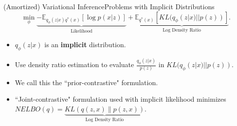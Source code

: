 \documentclass[handout]{beamer}
\newcommand{\E}{\mathbb{E}}
\begin{document}
\begin{frame}{(Amortized) Variational Inference}{Problems with Implicit Distributions}
\[\min_\phi \underbrace{-\mathbb{E}_{q_\phi(z|x)q^*(x)}[\log p(x|z)]}_\text{Likelihood}+\underbrace{\mathbb{E}_{q^*(x)}[KL(q_\phi(z|x)||p(z))]}_\text{Log Density Ratio}.\]
\begin{itemize}
\item $q_\phi(z|x)$ is an \textbf{implicit} distribution.
\vspace{0.2cm}
\item Use density ratio estimation to evaluate $\frac{q_\phi(z|x)}{p(z)}$ in $KL(q_\phi(z|x)||p(z))$.
\vspace{0.2cm}
\item We call this the ``prior-contrastive" formulation.
\vspace{0.2cm}
\item ``Joint-contrastive" formulation used with implicit likelihood minimizes $NELBO(q)=\underbrace{KL(q(z,x)\|p(z,x))}_\text{Log Density Ratio}$.
\end{itemize}
\end{frame}
\end{document}

